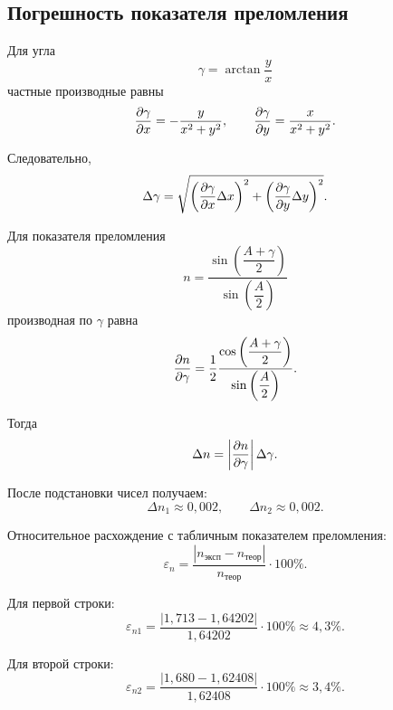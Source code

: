 \documentclass[a4paper,12pt]{article}
\begin{document}
\subsection{Погрешность показателя преломления}

Для угла
\begin{equation}
    \gamma=\arctan\frac{y}{x}
\end{equation}
частные производные равны
\begin{equation}
    \pdv{\gamma}{x}= -\frac{y}{x^2+y^2}, \qquad
    \pdv{\gamma}{y}= \frac{x}{x^2+y^2}.
\end{equation}

Следовательно,
\begin{equation}
    \Delta\gamma = \sqrt{\left(\pdv{\gamma}{x}\Delta x\right)^2+
    \left(\pdv{\gamma}{y}\Delta y\right)^2}.
\end{equation}

Для показателя преломления
\begin{equation}
    n = \frac{\sin\left(\dfrac{A+\gamma}{2}\right)}{\sin\left(\dfrac{A}{2}\right)}
\end{equation}
производная по $\gamma$ равна
\begin{equation}
    \pdv{n}{\gamma}=\frac{1}{2}\frac{\cos\left(\dfrac{A+\gamma}{2}\right)}{\sin\left(\dfrac{A}{2}\right)}.
\end{equation}

Тогда
\begin{equation}
    \Delta n = \left|\pdv{n}{\gamma}\right|\Delta\gamma.
\end{equation}

После подстановки чисел получаем:
\begin{equation}
    \Delta n_1 \approx 0{,}002, \qquad \Delta n_2 \approx 0{,}002.
\end{equation}

Относительное расхождение с табличным показателем преломления:
\begin{equation}
    \varepsilon_n = \frac{|n_{\text{эксп}}-n_{\text{теор}}|}{n_{\text{теор}}}\cdot100\%.
\end{equation}

Для первой строки:
\begin{equation}
    \varepsilon_{n1}=\frac{|1{,}713-1{,}64202|}{1{,}64202}\cdot100\%\approx4{,}3\%.
\end{equation}

Для второй строки:
\begin{equation}
    \varepsilon_{n2}=\frac{|1{,}680-1{,}62408|}{1{,}62408}\cdot100\%\approx3{,}4\%.
\end{equation}
\end{document}

